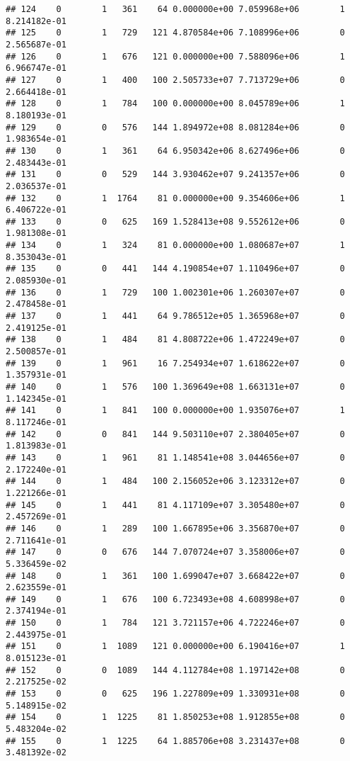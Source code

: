 \documentclass[
]{article}
\begin{document}
\begin{enumerate}
\begin{verbatim}
## 124    0        1   361    64 0.000000e+00 7.059968e+06        1  8.214182e-01
## 125    0        1   729   121 4.870584e+06 7.108996e+06        0  2.565687e-01
## 126    0        1   676   121 0.000000e+00 7.588096e+06        1  6.966747e-01
## 127    0        1   400   100 2.505733e+07 7.713729e+06        0  2.664418e-01
## 128    0        1   784   100 0.000000e+00 8.045789e+06        1  8.180193e-01
## 129    0        0   576   144 1.894972e+08 8.081284e+06        0  1.983654e-01
## 130    0        1   361    64 6.950342e+06 8.627496e+06        0  2.483443e-01
## 131    0        0   529   144 3.930462e+07 9.241357e+06        0  2.036537e-01
## 132    0        1  1764    81 0.000000e+00 9.354606e+06        1  6.406722e-01
## 133    0        0   625   169 1.528413e+08 9.552612e+06        0  1.981308e-01
## 134    0        1   324    81 0.000000e+00 1.080687e+07        1  8.353043e-01
## 135    0        0   441   144 4.190854e+07 1.110496e+07        0  2.085930e-01
## 136    0        1   729   100 1.002301e+06 1.260307e+07        0  2.478458e-01
## 137    0        1   441    64 9.786512e+05 1.365968e+07        0  2.419125e-01
## 138    0        1   484    81 4.808722e+06 1.472249e+07        0  2.500857e-01
## 139    0        1   961    16 7.254934e+07 1.618622e+07        0  1.357931e-01
## 140    0        1   576   100 1.369649e+08 1.663131e+07        0  1.142345e-01
## 141    0        1   841   100 0.000000e+00 1.935076e+07        1  8.117246e-01
## 142    0        0   841   144 9.503110e+07 2.380405e+07        0  1.813983e-01
## 143    0        1   961    81 1.148541e+08 3.044656e+07        0  2.172240e-01
## 144    0        1   484   100 2.156052e+06 3.123312e+07        0  1.221266e-01
## 145    0        1   441    81 4.117109e+07 3.305480e+07        0  2.457269e-01
## 146    0        1   289   100 1.667895e+06 3.356870e+07        0  2.711641e-01
## 147    0        0   676   144 7.070724e+07 3.358006e+07        0  5.336459e-02
## 148    0        1   361   100 1.699047e+07 3.668422e+07        0  2.623559e-01
## 149    0        1   676   100 6.723493e+08 4.608998e+07        0  2.374194e-01
## 150    0        1   784   121 3.721157e+06 4.722246e+07        0  2.443975e-01
## 151    0        1  1089   121 0.000000e+00 6.190416e+07        1  8.015123e-01
## 152    0        0  1089   144 4.112784e+08 1.197142e+08        0  2.217525e-02
## 153    0        0   625   196 1.227809e+09 1.330931e+08        0  5.148915e-02
## 154    0        1  1225    81 1.850253e+08 1.912855e+08        0  5.483204e-02
## 155    0        1  1225    64 1.885706e+08 3.231437e+08        0  3.481392e-02

\end{verbatim}
\end{enumerate}
\end{document}
